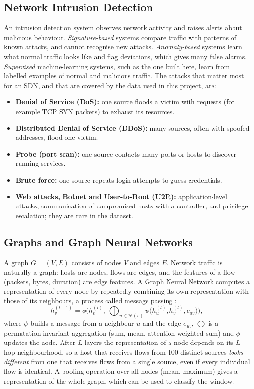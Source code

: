 \subsection{Network Intrusion Detection}
An intrusion detection system observes network activity and raises alerts about malicious behaviour. \emph{Signature-based} systems compare traffic with patterns of known attacks, and cannot recognise new attacks. \emph{Anomaly-based} systems learn what normal traffic looks like and flag deviations, which gives many false alarms. \emph{Supervised} machine-learning systems, such as the one built here, learn from labelled examples of normal and malicious traffic. The attacks that matter most for an SDN, and that are covered by the data used in this project, are:
\begin{itemize}
	\item \textbf{Denial of Service (DoS):} one source floods a victim with requests (for example TCP SYN packets) to exhaust its resources.
	\item \textbf{Distributed Denial of Service (DDoS):} many sources, often with spoofed addresses, flood one victim.
	\item \textbf{Probe (port scan):} one source contacts many ports or hosts to discover running services.
	\item \textbf{Brute force:} one source repeats login attempts to guess credentials.
	\item \textbf{Web attacks, Botnet and User-to-Root (U2R):} application-level attacks, communication of compromised hosts with a controller, and privilege escalation; they are rare in the dataset.
\end{itemize}

\subsection{Graphs and Graph Neural Networks}
A graph $G=(V,E)$ consists of nodes $V$ and edges $E$. Network traffic is naturally a graph: hosts are nodes, flows are edges, and the features of a flow (packets, bytes, duration) are edge features. A Graph Neural Network computes a representation of every node by repeatedly combining its own representation with those of its neighbours, a process called message passing \cite{bib:mpnn}:
\begin{equation}
h_v^{(l+1)}=\phi\Big(h_v^{(l)},\;\bigoplus_{u\in\mathcal{N}(v)}\psi\big(h_u^{(l)},h_v^{(l)},e_{uv}\big)\Big),
\label{eq:mp}
\end{equation}
where $\psi$ builds a message from a neighbour $u$ and the edge $e_{uv}$, $\bigoplus$ is a permutation-invariant aggregation (sum, mean, attention-weighted sum) and $\phi$ updates the node. After $L$ layers the representation of a node depends on its $L$-hop neighbourhood, so a host that receives flows from 100 distinct sources \emph{looks different} from one that receives flows from a single source, even if every individual flow is identical. A pooling operation over all nodes (mean, maximum) gives a representation of the whole graph, which can be used to classify the window.

